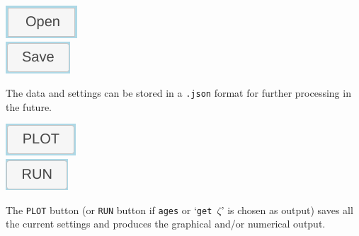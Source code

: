 \begin{refsection}
\noindent\begin{minipage}[t]{.15\textwidth}
\strut\vspace*{-\baselineskip}\newline
\includegraphics[width=.55\textwidth]{../figures/Open.png}\\
\includegraphics[width=.55\textwidth]{../figures/Save.png}\\
\end{minipage}
\begin{minipage}[t]{.85\textwidth}
The data and settings can be stored in a \texttt{.json} format for
further processing in the future.\\
\end{minipage}

\noindent\begin{minipage}[t]{.15\textwidth}
\strut\vspace*{-\baselineskip}\newline
\includegraphics[width=.55\textwidth]{../figures/PLOT.png}\\
\includegraphics[width=.55\textwidth]{../figures/RUN.png}\\
\end{minipage}
\begin{minipage}[t]{.85\textwidth}
The \texttt{PLOT} button (or \texttt{RUN} button if \texttt{ages} or
`\texttt{get $\zeta$}' is chosen as output) saves all the current
settings and produces the graphical and/or numerical output.\\
\end{minipage}


\end{refsection}
